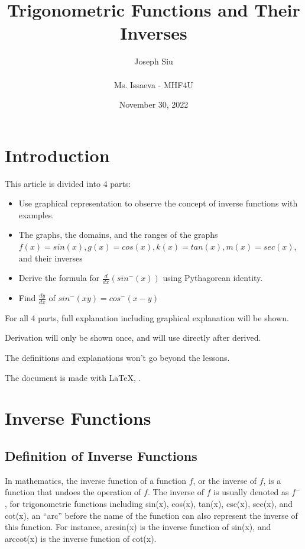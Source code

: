 \documentclass[12pt, titlepage]{article}
\title{Trigonometric Functions and Their Inverses}
\author{Joseph Siu \\ \\ Ms. Issaeva - MHF4U}
\date{November 30, 2022}
\begin{document}
\maketitle
\tableofcontents

\newpage
\section{Introduction}
    This article is divided into 4 parts:
    \begin{itemize}
        \item Use graphical representation to observe the concept of inverse functions with examples.
        \item The graphs, the domains, and the ranges of the graphs $f(x)=sin(x), g(x)=cos(x), k(x)=tan(x), m(x)=sec(x)$, and their inverses
        \item Derive the formula for $\frac{d}{dx}(sin^-(x))$ using Pythagorean identity. 
        \item Find $\frac{dy}{dx}$ of $sin^-(xy)=cos^-(x-y)$
    \end{itemize}
    
    For all 4 parts, full explanation including graphical explanation will be shown. 
    
    Derivation will only be shown once, and will use directly after derived.
    
    The definitions and explanations won't go beyond the lessons.

    The document is made with LaTeX, \href{https://www.overleaf.com/read/rsxwjmnsxprj}{\color{blue}{here is the link to the document}}.



\newpage
\section{Inverse Functions}
    \subsection{Definition of Inverse Functions}
    \label{sec:simp}
    In mathematics, the inverse function of a function $f$, or the inverse of $f$, is a function that undoes the operation of $f$. The inverse of $f$ is usually denoted as $f^-$, for trigonometric functions including sin(x), cos(x), tan(x), csc(x), sec(x), and cot(x), an ``arc'' before the name of the function can also represent the inverse of this function. For instance, arcsin(x) is the inverse function of sin(x), and arccot(x) is the inverse function of cot(x).
\end{document}
